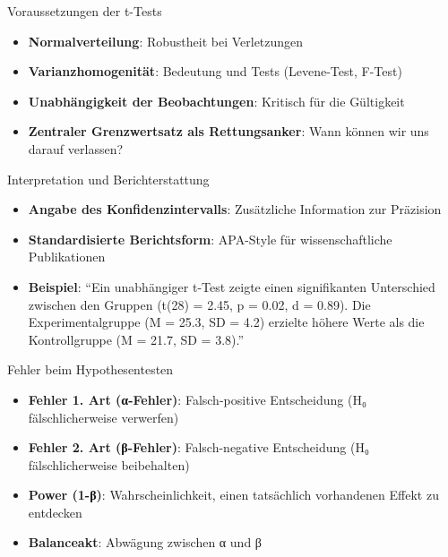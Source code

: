 \documentclass[
  ignorenonframetext,
]{beamer}
\providecommand{\tightlist}{%
  \setlength{\itemsep}{0pt}\setlength{\parskip}{0pt}}
\begin{document}
\begin{frame}{Voraussetzungen der t-Tests}
\protect{}\label{voraussetzungen-der-t-tests}
\begin{itemize}
\tightlist
\item
  \textbf{Normalverteilung}: Robustheit bei Verletzungen
\item
  \textbf{Varianzhomogenität}: Bedeutung und Tests (Levene-Test, F-Test)
\item
  \textbf{Unabhängigkeit der Beobachtungen}: Kritisch für die Gültigkeit
\item
  \textbf{Zentraler Grenzwertsatz als Rettungsanker}: Wann können wir
  uns darauf verlassen?
\end{itemize}
\end{frame}

\begin{frame}{Interpretation und Berichterstattung}
\protect{}\label{interpretation-und-berichterstattung}
\begin{itemize}
\tightlist
\item
  \textbf{Angabe des Konfidenzintervalls}: Zusätzliche Information zur
  Präzision
\item
  \textbf{Standardisierte Berichtsform}: APA-Style für wissenschaftliche
  Publikationen
\item
  \textbf{Beispiel}: ``Ein unabhängiger t-Test zeigte einen
  signifikanten Unterschied zwischen den Gruppen (t(28) = 2.45, p =
  0.02, d = 0.89). Die Experimentalgruppe (M = 25.3, SD = 4.2) erzielte
  höhere Werte als die Kontrollgruppe (M = 21.7, SD = 3.8).''
\end{itemize}
\end{frame}

\begin{frame}{Fehler beim Hypothesentesten}
\protect{}\label{fehler-beim-hypothesentesten}
\begin{itemize}
\tightlist
\item
  \textbf{Fehler 1. Art (α-Fehler)}: Falsch-positive Entscheidung (H₀
  fälschlicherweise verwerfen)
\item
  \textbf{Fehler 2. Art (β-Fehler)}: Falsch-negative Entscheidung (H₀
  fälschlicherweise beibehalten)
\item
  \textbf{Power (1-β)}: Wahrscheinlichkeit, einen tatsächlich
  vorhandenen Effekt zu entdecken
\item
  \textbf{Balanceakt}: Abwägung zwischen α und β
\end{itemize}
\end{frame}
\end{document}
